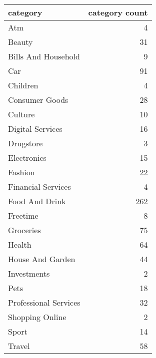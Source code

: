 \begin{tabular}{lr}
\toprule
             category &  category count \\
\midrule
                  Atm &               4 \\
               Beauty &              31 \\
  Bills And Household &               9 \\
                  Car &              91 \\
             Children &               4 \\
       Consumer Goods &              28 \\
              Culture &              10 \\
     Digital Services &              16 \\
            Drugstore &               3 \\
          Electronics &              15 \\
              Fashion &              22 \\
   Financial Services &               4 \\
       Food And Drink &             262 \\
             Freetime &               8 \\
            Groceries &              75 \\
               Health &              64 \\
     House And Garden &              44 \\
          Investments &               2 \\
                 Pets &              18 \\
Professional Services &              32 \\
      Shopping Online &               2 \\
                Sport &              14 \\
               Travel &              58 \\
\bottomrule
\end{tabular}
